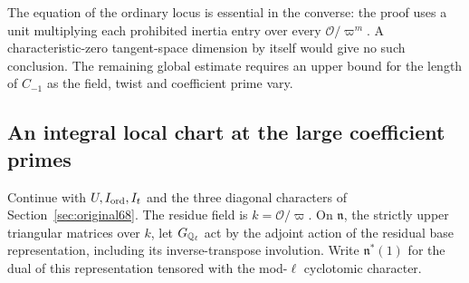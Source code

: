 \documentclass[a4paper,11pt]{article}
\theoremstyle{definition}
\theoremstyle{remark}
\numberwithin{equation}{section}
\newcommand{\OO}{\mathcal O}
\begin{document}
The equation of the ordinary locus is essential in the converse:
the proof uses a unit multiplying each prohibited inertia entry
over every \(\OO/\varpi^m\). A characteristic-zero tangent-space
dimension by itself would give no such conclusion. The remaining
global estimate requires an upper bound for the length of
\(C_{-1}\) as the field, twist and coefficient prime vary.

\subsection{An integral local chart at the large coefficient primes}\label{nav:IV-14}
\label{sec:chart69}

Continue with \(U,I_{\rm ord},I_t\) and the three diagonal
characters of Section~\ref{sec:original68}. The residue field
is \(k=\OO/\varpi\). On \(\mathfrak n\), the strictly upper
triangular matrices over \(k\), let \(G_{\mathbb Q_\ell}\) act by the
adjoint action of the residual base representation, including its
inverse-transpose involution. Write \(\mathfrak n^*(1)\) for
the dual of this representation tensored with the mod-\(\ell\)
cyclotomic character.
\end{document}
